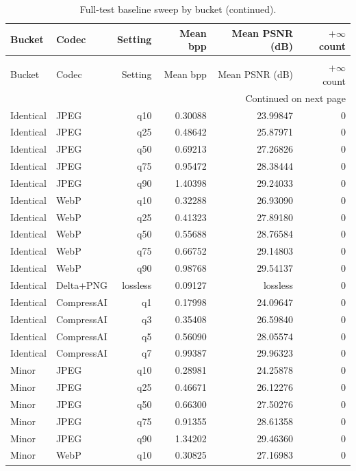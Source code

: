 \begin{longtable}{llrrrr}
\caption{Full-test baseline sweep by bucket ($n=400$ per bucket).}\label{tab:fullsweep}\\
\toprule
Bucket & Codec & Setting & Mean bpp & Mean PSNR (dB) & $+\infty$ count\\
\midrule
\endfirsthead
\caption[]{Full-test baseline sweep by bucket (continued).}\\
\toprule
Bucket & Codec & Setting & Mean bpp & Mean PSNR (dB) & $+\infty$ count\\
\midrule
\endhead
\midrule
\multicolumn{6}{r}{Continued on next page}\\
\endfoot
\bottomrule
\endlastfoot
Identical & JPEG & q10 & 0.30088 & 23.99847 & 0\\
Identical & JPEG & q25 & 0.48642 & 25.87971 & 0\\
Identical & JPEG & q50 & 0.69213 & 27.26826 & 0\\
Identical & JPEG & q75 & 0.95472 & 28.38444 & 0\\
Identical & JPEG & q90 & 1.40398 & 29.24033 & 0\\
Identical & WebP & q10 & 0.32288 & 26.93090 & 0\\
Identical & WebP & q25 & 0.41323 & 27.89180 & 0\\
Identical & WebP & q50 & 0.55688 & 28.76584 & 0\\
Identical & WebP & q75 & 0.66752 & 29.14803 & 0\\
Identical & WebP & q90 & 0.98768 & 29.54137 & 0\\
Identical & Delta+PNG & lossless & 0.09127 & lossless & 0\\
Identical & CompressAI & q1 & 0.17998 & 24.09647 & 0\\
Identical & CompressAI & q3 & 0.35408 & 26.59840 & 0\\
Identical & CompressAI & q5 & 0.56090 & 28.05574 & 0\\
Identical & CompressAI & q7 & 0.99387 & 29.96323 & 0\\
Minor & JPEG & q10 & 0.28981 & 24.25878 & 0\\
Minor & JPEG & q25 & 0.46671 & 26.12276 & 0\\
Minor & JPEG & q50 & 0.66300 & 27.50276 & 0\\
Minor & JPEG & q75 & 0.91355 & 28.61358 & 0\\
Minor & JPEG & q90 & 1.34202 & 29.46360 & 0\\
Minor & WebP & q10 & 0.30825 & 27.16983 & 0\\

\end{longtable}
